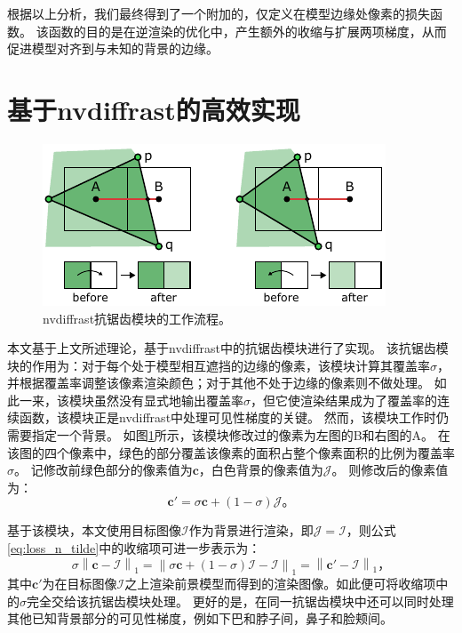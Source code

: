 
根据以上分析，我们最终得到了一个附加的，仅定义在模型边缘处像素的损失函数。
该函数的目的是在逆渲染的优化中，产生额外的收缩与扩展两项梯度，从而促进模型对齐到与未知的背景的边缘。

\section{基于nvdiffrast的高效实现}

\begin{figure}[ht]
    \centering
    \includegraphics{figures/antialias}
    \caption[nvdiffrast抗锯齿模块的工作流程]{nvdiffrast抗锯齿模块的工作流程\citep{nvdiffrast}。}
    \label{fig:aa}
\end{figure}
本文基于上文所述理论，基于nvdiffrast\citep{nvdiffrast}中的抗锯齿模块进行了实现。
该抗锯齿模块的作用为：对于每个处于模型相互遮挡的边缘的像素，该模块计算其覆盖率$\sigma$，并根据覆盖率调整该像素渲染颜色；对于其他不处于边缘的像素则不做处理。
如此一来，该模块虽然没有显式地输出覆盖率$\sigma$，但它使渲染结果成为了覆盖率的连续函数，该模块正是nvdiffrast中处理可见性梯度的关键。
然而，该模块工作时仍需要指定一个背景。
如图\ref{fig:aa}所示，该模块修改过的像素为左图的B和右图的A。
在该图的四个像素中，绿色的部分覆盖该像素的面积占整个像素面积的比例为覆盖率$\sigma$。
记修改前绿色部分的像素值为$\mathbf{c}$，白色背景的像素值为$\mathcal{J}$。
则修改后的像素值为：
\begin{equation}
\mathbf{c}' = \sigma\mathbf{c} + (1-\sigma)\mathcal{J}
\text{。}
\end{equation}

基于该模块，本文使用目标图像$\mathcal{I}$作为背景进行渲染，即$\mathcal{J}=\mathcal{I}$，则公式\ref{eq:loss_n_tilde}中的收缩项可进一步表示为：
\begin{equation}
\sigma\left\| \mathbf{c} - \mathcal{I} \right\|_1 =
\left\| \sigma\mathbf{c} + (1-\sigma)\mathcal{I} - \mathcal{I} \right\|_1 =
\left\| \mathbf{c}' - \mathcal{I} \right\|_1
\text{，}
\label{eq:impl_nvdiffrast}
\end{equation}
其中$\mathbf{c}'$为在目标图像$\mathcal{I}$之上渲染前景模型而得到的渲染图像。如此便可将收缩项中的$\sigma$完全交给该抗锯齿模块处理。
更好的是，在同一抗锯齿模块中还可以同时处理其他已知背景部分的可见性梯度，例如下巴和脖子间，鼻子和脸颊间。

